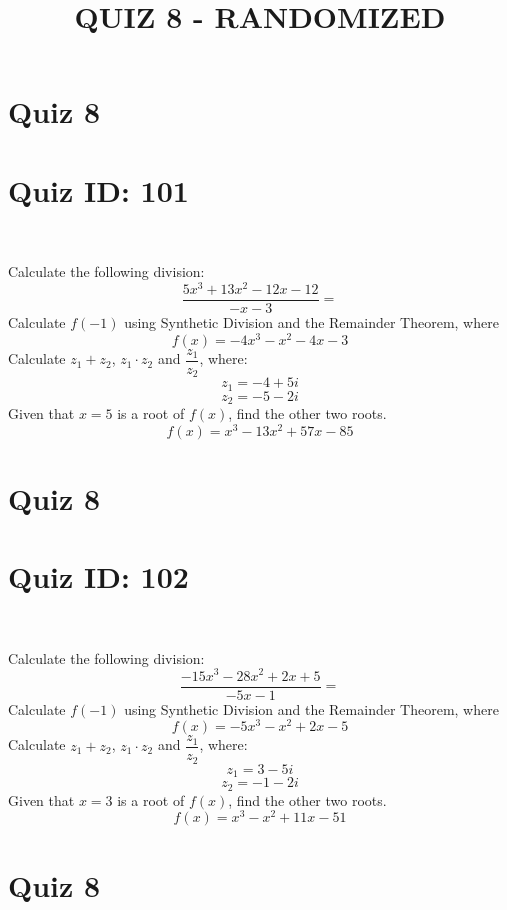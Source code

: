 \documentclass{exam}
\title{QUIZ 8 - RANDOMIZED}
\begin{document}
\newpage
\section*{Quiz 8}
\section*{Quiz ID: 101}
\vspace{0.5cm}\
\vspace{1cm}\
\begin{questions}
\question Calculate the following division:\[\dfrac{
5x^3 + 13x^2 - 12x - 12}{
-x - 3}=\] \makeemptybox{\stretch{2}}
\question Calculate $f(-1)$ using Synthetic Division and the Remainder Theorem, where\[f(x) = 
-4x^3 - x^2 - 4x - 3\]
\newpage\question Calculate $z_1+z_2$, $z_1\cdot z_2$ and $\dfrac{z_1}{z_2}$, where:\[z_1=-4+5\mathit{i}\]\[z_2=-5-2\mathit{i}\]
\question Given that $x=5$ is a root of $f(x)$, find the other two roots.\[f(x)=
x^3 - 13x^2 + 57x - 85\]\makeemptybox{\stretch{1}}
\end{questions}\newpage
\newpage
\section*{Quiz 8}
\section*{Quiz ID: 102}
\vspace{0.5cm}\
\vspace{1cm}\
\begin{questions}
\question Calculate the following division:\[\dfrac{
-15x^3 - 28x^2 + 2x + 5}{
-5x - 1}=\] 
\question Calculate $f(-1)$ using Synthetic Division and the Remainder Theorem, where\[f(x) = 
-5x^3 - x^2 + 2x - 5\]
\newpage\question Calculate $z_1+z_2$, $z_1\cdot z_2$ and $\dfrac{z_1}{z_2}$, where:\[z_1=3-5\mathit{i}\]\[z_2=-1-2\mathit{i}\]\makeemptybox{\stretch{1}}
\question Given that $x=3$ is a root of $f(x)$, find the other two roots.\[f(x)=
x^3 - x^2 + 11x - 51\]\makeemptybox{\stretch{1}}
\end{questions}\newpage
\newpage
\section*{Quiz 8}
\end{document}
